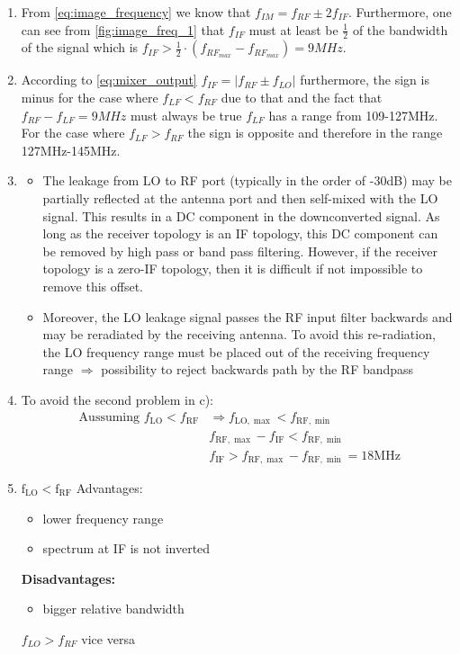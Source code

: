 \begin{enumerate}
    \item From \autoref{eq:image_frequency} we know that $f_{I M}=f_{R F} \pm 2 f_{I F}$. Furthermore, one can see from \autoref{fig:image_freq_1} that $f_{I F}$ must at least be $\frac{1}{2}$ of the bandwidth of the signal which is $f_{I F} > \frac{1}{2}\cdot (f_{RF_{max}}-f_{RF_{max}})=9MHz$.
    \item According to \autoref{eq:mixer_output} $f_{I F}=\left|f_{R F} \pm f_{L O}\right|$ furthermore, the sign is minus for the case where $f_{L F}<f_{R F}$ due to that and the fact that $f_{R F}-f_{L F}=9MHz$ must always be true $f_{L F}$ has a range from 109-127MHz. For the case where $f_{L F}>f_{R F}$ the sign is opposite and therefore in the range 127MHz-145MHz.
    \item 
    \begin{itemize}
        \item The leakage from LO to RF port (typically in the order of -30dB) may be partially reflected at the antenna port and then self-mixed with the LO signal. This results in a DC component in the downconverted signal. As long as the receiver topology is an IF topology, this DC component can be removed by high pass or band pass filtering. However, if the receiver topology is a zero-IF topology, then it is difficult if not impossible to remove this offset.
        \item Moreover, the LO leakage signal passes the RF input filter backwards and may be reradiated by the receiving antenna. To avoid this re-radiation, the LO frequency range must be placed out of the receiving frequency range $\Rightarrow$ possibility to reject backwards path by the RF bandpass
    \end{itemize}
    \item To avoid the second problem in c):
    $$
    \begin{aligned}
    \text { Aussuming } f_{\mathrm{LO}}<f_{\mathrm{RF}} & \Rightarrow f_{\mathrm{LO}, \max }<f_{\mathrm{RF}, \min } \\
    & f_{\mathrm{RF}, \max }-f_{\mathrm{IF}}<f_{\mathrm{RF}, \min } \\
    & f_{\mathrm{IF}}>f_{\mathrm{RF}, \max }-f_{\mathrm{RF}, \min }=18 \mathrm{MHz}
    \end{aligned}
    $$
    \item $\mathrm{f}_{\mathrm{LO}}<\mathrm{f}_{\mathrm{RF}}$\newline
    Advantages:
    \begin{itemize}
        \item lower frequency range
        \item spectrum at IF is not inverted
    \end{itemize}
    \textbf{Disadvantages:}
    \begin{itemize}
        \item bigger relative bandwidth
    \end{itemize}
    $f_{L O}>f_{R F}$ vice versa
\end{enumerate}





